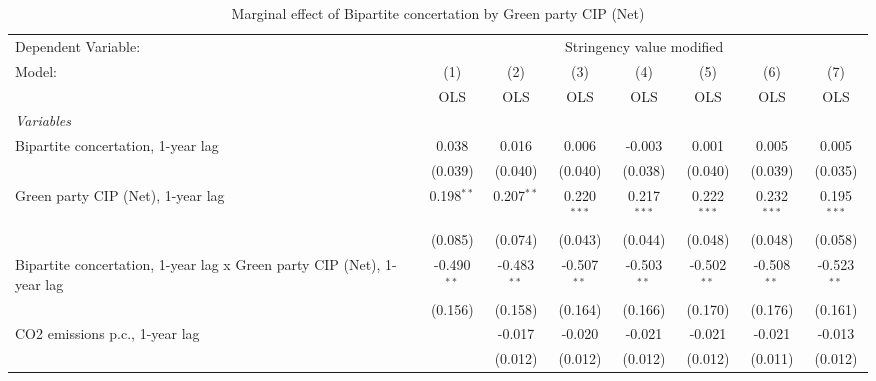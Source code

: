 
\begin{table}[htbp]
   \caption{Marginal effect of Bipartite concertation by Green party CIP (Net)}
   \centering
   \begin{tabular}{lccccccc}
      \toprule
      Dependent Variable: & \multicolumn{7}{c}{Stringency value modified}\\
      Model:                                                                 & (1)           & (2)           & (3)           & (4)           & (5)           & (6)           & (7)\\  
                                                                             &  OLS          & OLS           & OLS           & OLS           & OLS           & OLS           & OLS\\  
      \midrule
      \emph{Variables}\\
      Bipartite concertation, 1-year lag                                     & 0.038         & 0.016         & 0.006         & -0.003        & 0.001         & 0.005         & 0.005\\   
                                                                             & (0.039)       & (0.040)       & (0.040)       & (0.038)       & (0.040)       & (0.039)       & (0.035)\\   
      Green party CIP (Net), 1-year lag                                      & 0.198$^{**}$  & 0.207$^{**}$  & 0.220$^{***}$ & 0.217$^{***}$ & 0.222$^{***}$ & 0.232$^{***}$ & 0.195$^{***}$\\   
                                                                             & (0.085)       & (0.074)       & (0.043)       & (0.044)       & (0.048)       & (0.048)       & (0.058)\\   
      Bipartite concertation, 1-year lag x Green party CIP (Net), 1-year lag & -0.490$^{**}$ & -0.483$^{**}$ & -0.507$^{**}$ & -0.503$^{**}$ & -0.502$^{**}$ & -0.508$^{**}$ & -0.523$^{**}$\\   
                                                                             & (0.156)       & (0.158)       & (0.164)       & (0.166)       & (0.170)       & (0.176)       & (0.161)\\   
      CO2 emissions p.c., 1-year lag                                         &               & -0.017        & -0.020        & -0.021        & -0.021        & -0.021        & -0.013\\   
                                                                             &               & (0.012)       & (0.012)       & (0.012)       & (0.012)       & (0.011)       & (0.012)\\   

\end{tabular}
\end{table}
